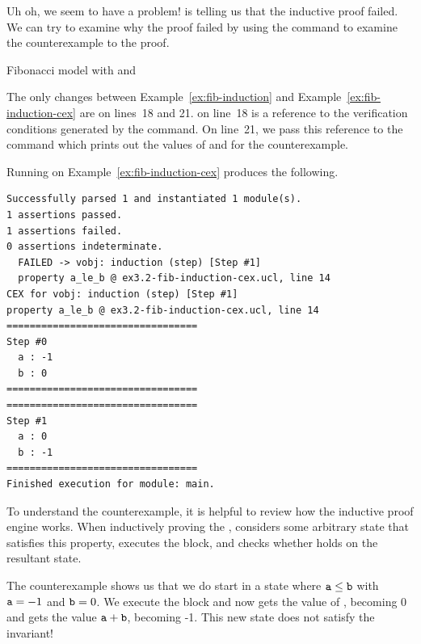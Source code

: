 Uh oh, we seem to have a problem! \uclid{} is telling us that the inductive proof failed. We can try to examine why the proof failed by using the  command to examine the counterexample to the proof.

\begin{uclidlisting}[htbp]
    
    \caption{\uclid{} Fibonacci model with  and }
    \label{ex:fib-induction-cex}
\end{uclidlisting}

The only changes between Example~\ref{ex:fib-induction} and Example~\ref{ex:fib-induction-cex} are on lines~18 and 21.  on line~18 is a reference to the verification conditions generated by the  command. On line~21, we pass this reference to the  command which prints out the values of  and  for the counterexample.

Running \uclid{} on Example~\ref{ex:fib-induction-cex} produces the following.

\begin{Verbatim}[frame=single, samepage=true]
Successfully parsed 1 and instantiated 1 module(s).
1 assertions passed.
1 assertions failed.
0 assertions indeterminate.
  FAILED -> vobj: induction (step) [Step #1] 
  property a_le_b @ ex3.2-fib-induction-cex.ucl, line 14
CEX for vobj: induction (step) [Step #1] 
property a_le_b @ ex3.2-fib-induction-cex.ucl, line 14
=================================
Step #0
  a : -1
  b : 0
=================================
=================================
Step #1
  a : 0
  b : -1
=================================
Finished execution for module: main.
\end{Verbatim}

To understand the counterexample, it is helpful to review how the inductive proof engine works. When inductively proving the  , \uclid{} considers some arbitrary state that satisfies this property, executes the  block, and checks whether  holds on the resultant state.

The counterexample shows us that we do start in a state where $\texttt{a} \le \texttt{b}$ with $\texttt{a}=-1$ and $\texttt{b}=0$. We execute the  block and now  gets the value of , becoming 0 and  gets the value $\texttt{a} + \texttt{b}$, becoming -1. This new state does not satisfy the invariant!

